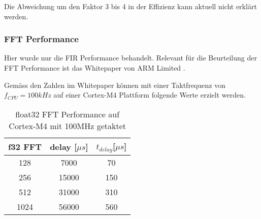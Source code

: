 Die Abweichung um den Faktor 3 bis 4 in der Effizienz kann aktuell nicht erklärt werden.

\subsubsection{FFT Performance}

Hier wurde nur die FIR Performance behandelt. Relevant für die Beurteilung der FFT Performance ist das Whitepaper von ARM Limited \cite{ARM-Performance-Whitepaper}.

Gemäss den Zahlen im Whitepaper können mit einer Taktfrequenz von $f_{CPU}=100\si{kHz}$ auf einer Cortex-M4 Plattform folgende Werte erzielt werden.

\begin{table}[H]
	\centering
	\begin{tabular}{|c|c|c|}
		\hline
		\textbf{f32 FFT} & \textbf{delay {[}$\mu s${]}} & \textbf{$t_{delay}${[}$\mu\si{s}${]}} \\ \hline
		128              & 7000                & 70                             \\ \hline
		256              & 15000               & 150                            \\ \hline
		512              & 31000               & 310                            \\ \hline
		1024             & 56000               & 560                            \\ \hline
	\end{tabular}
	\caption{float32 FFT Performance auf Cortex-M4 mit 100MHz getaktet}
	\label{tab:FFT_performance}
\end{table}





